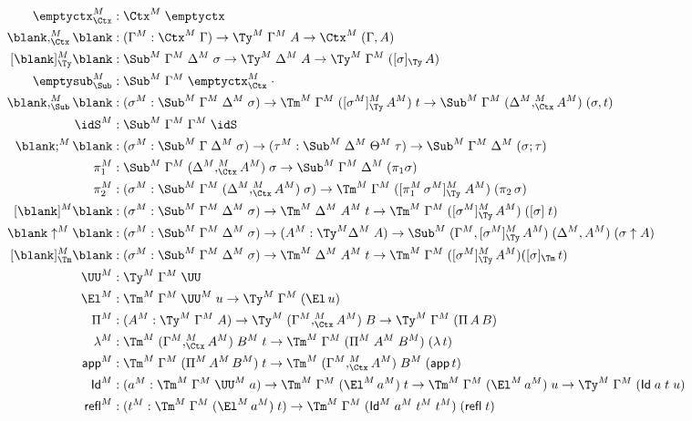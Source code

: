 \documentclass[a4paper,UKenglish,numberwithinsect,cleveref,thm-restate]{lipics-v2021}
\begin{document}
\begin{alignat*}{10}
  \emptyctx_{\Ctx}^M     & : \Ctx^M\;\emptyctx \\
  \blank,_{\Ctx}^M\blank & : (\Gamma^M : \Ctx^M\;\Gamma) \to \Ty^M\;\Gamma^M\;A \to \Ctx^M\;(\Gamma, A) \\
  [\blank]_{\Ty}^M\blank & : \Sub^M\;\Gamma^M\;\Delta^M\;\sigma \to \Ty^M\;\Delta^M\;A \to \Ty^M\;\Gamma^M\;([\sigma]_{\Ty}\,A) \\
  \emptysub_{\Sub}^M     & : \Sub^M\;\Gamma^M\;\emptyctx_{\Ctx}^M\;\cdot \\
  \blank,_{\Sub}^M\blank & : (\sigma^M : \Sub^M\;\Gamma^M\;\Delta^M\;\sigma) \to \Tm^M\;\Gamma^M\;([\sigma^M]^M_{\Ty}\,A^M)\;t \to \Sub^M\;\Gamma^M\;(\Delta^M ,^M_{\Ctx} A^M)\;(\sigma, t) \\
  \idS^M                 & : \Sub^M\;\Gamma^M\;\Gamma^M\;\idS \\
  \blank;^M\blank        & : (\sigma^M : \Sub^M\;\Gamma\;\Delta^M\;\sigma) \to (\tau^M : \Sub^M\;\Delta^M\;\Theta^M\;\tau) \to \Sub^M\;\Gamma^M\;\Delta^M\;(\sigma ; \tau) \\
  \pi_1^M                & : \Sub^M\;\Gamma^M\;(\Delta^M ,_{\Ctx}^M A^M)\;\sigma \to \Sub^M\;\Gamma^M\;\Delta^M\;(\pi_1\sigma) \\
  \pi_2^M                & : (\sigma^M : \Sub^M\;\Gamma^M\;(\Delta^M ,_{\Ctx}^M A^M)\;\sigma) \to \Tm^M\;\Gamma^M\;([ \pi_1^M\,\sigma^M ]^M_{\Ty}\;A^M)\;(\pi_2\,\sigma) \\
  [\blank]^M\blank       & : (\sigma^M : \Sub^M\;\Gamma^M\;\Delta^M\;\sigma) \to \Tm^M\;\Delta^M\;A^M\;t \to \Tm^M\;\Gamma^M\;([\sigma^M]_{\Ty}^M\,A^M)\;([\sigma]\;t) \\
  \blank\uparrow^M\blank & : (\sigma^M : \Sub^M\;\Gamma^M\;\Delta^M\;\sigma) \to (A^M : \Ty^M\Delta^M\;A) \to \Sub^M\;(\Gamma^M, [\sigma^M]_{\Ty}^M\,A^M)\;(\Delta^M, A^M)\;(\sigma \uparrow A) \\
  [\blank]_{\Tm}^M\blank & : (\sigma^M : \Sub^M\;\Gamma^M\;\Delta^M\;\sigma) \to \Tm^M\;\Delta^M\;A^M\;t \to \Tm^M\;\Gamma^M\;([\sigma^M]_{\Ty}^M\,A^M)([\sigma]_{\Tm}\,t) \\
  \UU^M                  & : \Ty^M\;\Gamma^M\;\UU \\
  \El^M                  & : \Tm^M\;\Gamma^M\;\UU^M\;u \to \Ty^M\;\Gamma^M\;(\El\,u) \\
  \Pi^M                  & : (A^M : \Ty^M\;\Gamma^M\;A) \to \Ty^M\;(\Gamma^M ,_{\Ctx}^M A^M)\;B \to \Ty^M\;\Gamma^M\;(\Pi\,A\,B)  \\
  \lambda^M              & : \Tm^M\;(\Gamma^M ,_{\Ctx}^M A^M)\;B^M\;t \to \Tm^M\;\Gamma^M\;(\Pi^M\;A^M\;B^M)\;(\lambda\,t) \\
  \mathsf{app}^M         & : \Tm^M\;\Gamma^M\;(\Pi^M\,A^M\,B^M)\;t \to \Tm^M\;(\Gamma^M ,_{\Ctx}^M A^M)\;B^M\;(\mathsf{app}\,t) \\
  \mathsf{Id}^M          & : (a^M : \Tm^M\;\Gamma^M\;\UU^M\;a) \to \Tm^M\;\Gamma^M\;(\El^M\,a^M)\;t \to \Tm^M\;\Gamma^M\;(\El^M\,a^M)\;u \to \Ty^M\;\Gamma^M\;(\mathsf{Id}\;a\;t\;u)  \\
  \mathsf{refl}^M        & : (t^M : \Tm^M\;\Gamma^M\;(\El^M\,a^M)\;t) \to \Tm^M\;\Gamma^M\;(\mathsf{Id}^M\;a^M\;t^M\;t^M)\;(\mathsf{refl}\;t) 
\end{alignat*}
\end{document}
